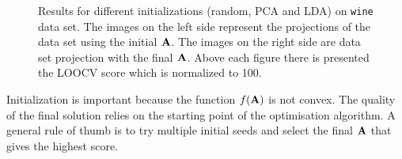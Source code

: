 \begin{figure}
	  
	  
	  \caption[Effects of initialization on \texttt{wine} data set]{\small Results for different initializations (random, PCA and LDA) on \texttt{wine} data set. The images on the left side represent the projections of the data set using the initial $\mathbf{A}$. The images on the right side are data set projection with the final $\mathbf{A}$. Above each figure there is presented the LOOCV score which is normalized to 100.}
	  \label{fig:init}
    \end{figure}

    Initialization is important because the function $f(\mathbf{A})$ is not convex. The quality of the final solution relies on the starting point of the optimisation algorithm. A general rule of thumb is to try multiple initial seeds and select the final $\mathbf{A}$ that gives the highest score.

